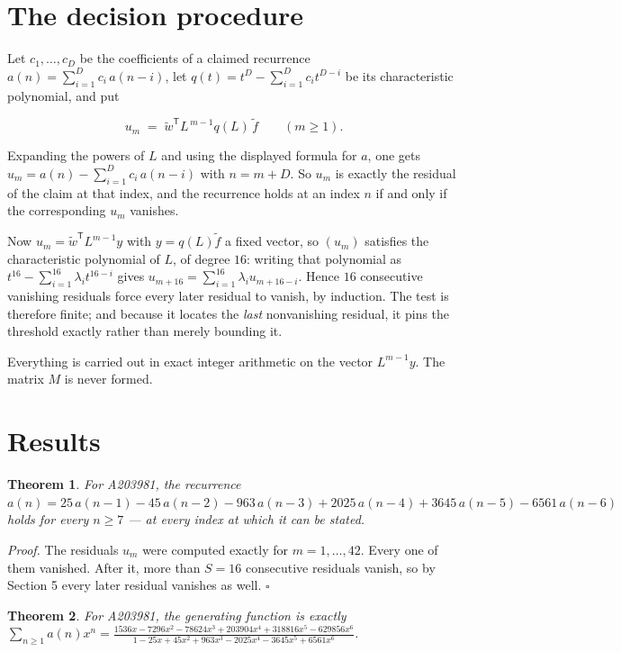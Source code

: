 \documentclass[11pt]{article}
\newtheorem{theorem}{Theorem}
\theoremstyle{definition}
\begin{document}
\section{The decision procedure}

Let $c_1,\dots,c_D$ be the coefficients of a claimed recurrence $a(n) = \sum_{i=1}^{D} c_i\,a(n-i)$, let $q(t) = t^{D} - \sum_{i=1}^{D} c_i t^{D-i}$ be its characteristic polynomial, and put

\[u_m \;=\; \tilde w^{\mathsf T} L^{\,m-1} q(L)\,\tilde f \qquad (m \ge 1).\]

Expanding the powers of $L$ and using the displayed formula for $a$, one gets $u_m = a(n) - \sum_{i=1}^{D} c_i\,a(n-i)$ with $n = m + D$. So $u_m$ is exactly the residual of the claim at that index, and the recurrence holds at an index $n$ if and only if the corresponding $u_m$ vanishes.

Now $u_m = \tilde w^{\mathsf T} L^{m-1} y$ with $y = q(L)\tilde f$ a fixed vector, so $(u_m)$ satisfies the characteristic polynomial of $L$, of degree $16$: writing that polynomial as $t^{16} - \sum_{i=1}^{16} \lambda_i t^{16-i}$ gives $u_{m+16} = \sum_{i=1}^{16} \lambda_i u_{m+16-i}$. Hence $16$ consecutive vanishing residuals force every later residual to vanish, by induction. The test is therefore finite; and because it locates the {\itshape last} nonvanishing residual, it pins the threshold exactly rather than merely bounding it.

Everything is carried out in exact integer arithmetic on the vector $L^{m-1}y$. The matrix $M$ is never formed.

\section{Results}

\begin{theorem} For A203981, the recurrence $a(n) = 25\,a(n-1) - 45\,a(n-2) - 963\,a(n-3) + 2025\,a(n-4) + 3645\,a(n-5) - 6561\,a(n-6)$ holds for every $n \ge 7$ --- at every index at which it can be stated.\end{theorem}

{\itshape Proof.} The residuals $u_m$ were computed exactly for $m = 1,\dots,42$. Every one of them vanished. After it, more than $S = 16$ consecutive residuals vanish, so by Section 5 every later residual vanishes as well. $\square$

\begin{theorem} For A203981, the generating function is exactly $\sum_{n\ge 1} a(n)x^n = \frac{1536x - 7296x^{2} - 78624x^{3} + 203904x^{4} + 318816x^{5} - 629856x^{6}}{1 - 25x + 45x^{2} + 963x^{3} - 2025x^{4} - 3645x^{5} + 6561x^{6}}$.\end{theorem}
\end{document}
